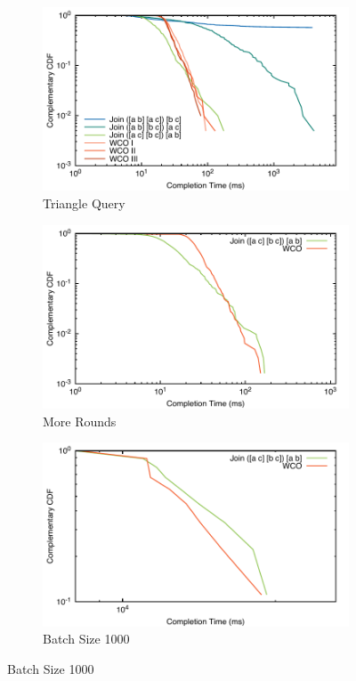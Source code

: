 \documentclass[../catalog.tex]{subfiles}
\begin{document}
\begin{figure}[h!]
  \begin{subfigure}{1.0\textwidth}
    \includegraphics[width=1.0\linewidth]{results/triangles/out/all_cdfs}
    \caption{Triangle Query}
    \label{fig:triangle-cdfs}
  \end{subfigure}
  \begin{subfigure}{.5\textwidth}
    \includegraphics[width=1.0\linewidth]{results/triangles/out/extended_cdf}
    \caption{More Rounds}
    \label{fig:triangle-cdfs-extended}
  \end{subfigure}
  \begin{subfigure}{.5\textwidth}
    \includegraphics[width=1.0\linewidth]{results/triangles/out/batch_cdf}
    \caption{Batch Size 1000}
    \label{fig:triangle-cdfs-batch}
  \end{subfigure}


\end{figure}
\end{document}
